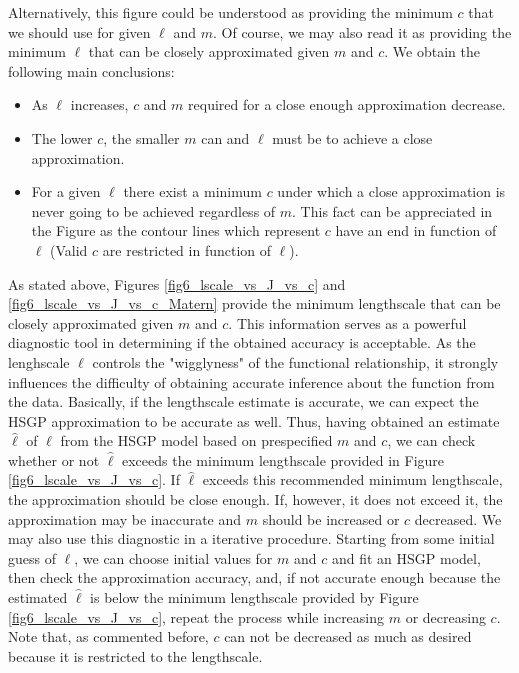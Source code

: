 \documentclass[]{interact}
\theoremstyle{plain}%
\theoremstyle{definition}
\theoremstyle{remark}
\begin{document}
\noindent Alternatively, this figure could be understood as providing the minimum $c$ that we should use for given $\ell$ and $m$. Of course, we may also read it as providing the minimum $\ell$ that can be closely approximated given $m$ and $c$. We obtain the following main conclusions:

\begin{itemize}
\item As $\ell$ increases, $c$ and $m$ required for a close enough approximation decrease.
\item The lower $c$, the smaller $m$ can and $\ell$ must be to achieve a close approximation.
\item For a given $\ell$ there exist a minimum $c$ under which a close approximation is never going to be achieved regardless of $m$. This fact can be appreciated in the Figure as the contour lines which represent $c$ have an end in function of $\ell$ (Valid $c$ are restricted in function of $\ell$).
\end{itemize}

As stated above, Figures \ref{fig6_lscale_vs_J_vs_c} and \ref{fig6_lscale_vs_J_vs_c_Matern} provide the minimum lengthscale that can be closely approximated given $m$ and $c$. This information serves as a powerful diagnostic tool in determining if the obtained accuracy is acceptable. As the lenghscale $\ell$ controls the "wigglyness" of
the functional relationship, it strongly influences the difficulty of obtaining accurate
inference about the function from the data. Basically, if the lengthscale estimate is accurate, 
we can expect the HSGP approximation to be accurate as well. Thus, having obtained an estimate $\hat{\ell}$ of $\ell$ from the HSGP model based on prespecified $m$ and $c$, we can check whether or not $\hat{\ell}$ exceeds the minimum lengthscale provided in Figure \ref{fig6_lscale_vs_J_vs_c}. If $\hat{\ell}$ exceeds this recommended minimum lengthscale, the approximation should be close enough. If, however, it does not exceed it, the approximation may be inaccurate and $m$ should be increased or $c$ decreased. We may also use this diagnostic in a iterative procedure.
Starting from some initial guess of $\ell$, we can choose initial values for $m$ and $c$ and fit an HSGP model, then check the approximation accuracy, and, if not accurate enough because the estimated $\hat{\ell}$ is below the minimum lengthscale provided by Figure \ref{fig6_lscale_vs_J_vs_c}, repeat the process while increasing $m$ or decreasing $c$. Note that, as commented before, $c$ can not be decreased as much as desired because it is restricted to the lengthscale.
\end{document}
